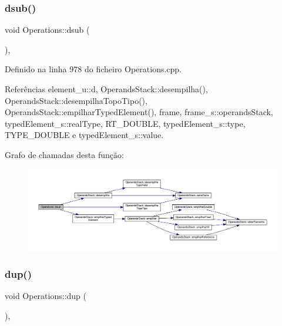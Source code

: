 \subsubsection{\texorpdfstring{dsub()}{dsub()}}
{\footnotesize\ttfamily void Operations\+::dsub (\begin{DoxyParamCaption}{ }\end{DoxyParamCaption})\hspace{0.3cm}{\ttfamily [static]}, {\ttfamily [private]}}



Definido na linha 978 do ficheiro Operations.\+cpp.



Referências element\+\_\+u\+::d, Operands\+Stack\+::desempilha(), Operands\+Stack\+::desempilha\+Topo\+Tipo(), Operands\+Stack\+::empilhar\+Typed\+Element(), frame, frame\+\_\+s\+::operands\+Stack, typed\+Element\+\_\+s\+::real\+Type, R\+T\+\_\+\+D\+O\+U\+B\+LE, typed\+Element\+\_\+s\+::type, T\+Y\+P\+E\+\_\+\+D\+O\+U\+B\+LE e typed\+Element\+\_\+s\+::value.

Grafo de chamadas desta função\+:\nopagebreak
\begin{figure}[H]
\begin{center}
\leavevmode
\includegraphics[width=350pt]{classOperations_aa994b0cf4aead2646fa5bb90c2643664_cgraph}
\end{center}
\end{figure}
\mbox{\label{classOperations_a0cba4ff895f2e3908eea5b39305481a4}} 
\subsubsection{\texorpdfstring{dup()}{dup()}}
{\footnotesize\ttfamily void Operations\+::dup (\begin{DoxyParamCaption}{ }\end{DoxyParamCaption})\hspace{0.3cm}{\ttfamily [static]}, {\ttfamily [private]}}



